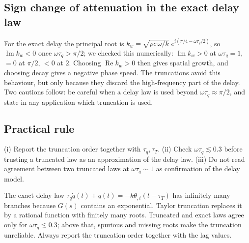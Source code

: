 \subsection{Sign change of attenuation in the exact delay law}
For the exact delay the principal root is $k_w=\sqrt{\rho c\,\omega/k}\;e^{i(\pi/4-\omega\tau_q/2)}$, so $\operatorname{Im}k_w<0$ once $\omega\tau_q>\pi/2$; we checked this numerically: $\operatorname{Im}k_w>0$ at $\omega\tau_q=1$, $=0$ at $\pi/2$, $<0$ at $2$. Choosing $\operatorname{Re}k_w>0$ then gives spatial growth, and choosing decay gives a negative phase speed. The truncations avoid this behaviour, but only because they discard the high-frequency part of the delay. Two cautions follow: be careful when a delay law is used beyond $\omega\tau_q\approx\pi/2$, and state in any application which truncation is used.

\subsection{Practical rule}
(i) Report the truncation order together with $\tau_q,\tau_T$. (ii) Check $\omega\tau_q\lesssim0.3$ before trusting a truncated law as an approximation of the delay law. (iii) Do not read agreement between two truncated laws at $\omega\tau_q\sim1$ as confirmation of the delay model.


\begin{summarybox}[Summary]
The exact delay law $\tau_q\dot q(t)+q(t)=-k\theta_{,i}(t-\tau_T)$ has infinitely many branches because $G(s)$ contains an exponential. Taylor truncation replaces it by a rational function with finitely many roots. Truncated and exact laws agree only for $\omega\tau_q\lesssim0.3$; above that, spurious and missing roots make the truncation unreliable. Always report the truncation order together with the lag values.
\end{summarybox}
